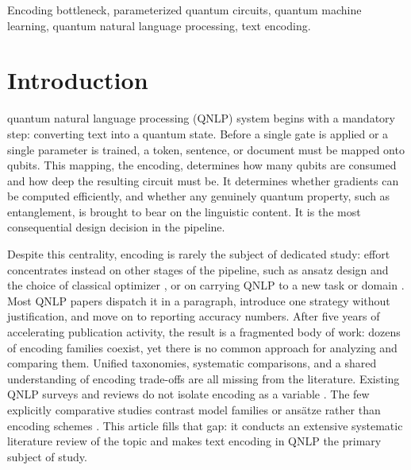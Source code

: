 \documentclass{ieeeaccess}
\begin{document}
\begin{keywords}
Encoding bottleneck, parameterized quantum circuits, quantum machine learning, quantum natural language processing, text encoding.
\end{keywords}

\titlepgskip=-15pt

\maketitle

\section{Introduction}
\label{sec:introduction}
 quantum natural language processing (QNLP) system begins with a mandatory step: converting text into a quantum state. Before a single gate is applied or a single parameter is trained, a token, sentence, or document must be mapped onto qubits. This mapping, the encoding, determines how many qubits are consumed and how deep the resulting circuit must be. It determines whether gradients can be computed efficiently, and whether any genuinely quantum property, such as entanglement, is brought to bear on the linguistic content. It is the most consequential design decision in the pipeline.

Despite this centrality, encoding is rarely the subject of dedicated study: effort concentrates instead on other stages of the pipeline, such as ansatz design \cite{ruskanda_simple_2023,abiwardani_generalized_2025} and the choice of classical optimizer \cite{rajashekharaiah_sentence_2023}, or on carrying QNLP to a new task or domain \cite{abbaszadeh_hybrid_2026,kesiku_unlocking_2026}. Most QNLP papers dispatch it in a paragraph, introduce one strategy without justification, and move on to reporting accuracy numbers. After five years of accelerating publication activity, the result is a fragmented body of work: dozens of encoding families coexist, yet there is no common approach for analyzing and comparing them. Unified taxonomies, systematic comparisons, and a shared understanding of encoding trade-offs are all missing from the literature. Existing QNLP surveys and reviews do not isolate encoding as a variable \cite{chen_survey_2024,pallavi_quantum_2025}. The few explicitly comparative studies contrast model families or ans\"atze rather than encoding schemes \cite{bouakba_comparative_2025,castillo_comparative_2025}. This article fills that gap: it conducts an extensive systematic literature review of the topic and makes text encoding in QNLP the primary subject of study.
\end{document}
